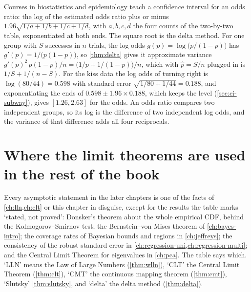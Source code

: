 \begin{bridge}
Courses in biostatistics and epidemiology teach a confidence interval for an odds ratio: the log of the estimated odds ratio plus or minus $1.96\sqrt{1/a + 1/b + 1/c + 1/d}$, with $a, b, c, d$ the four counts of the two-by-two table, exponentiated at both ends.
The square root is the delta method.
For one group with $S$ successes in $n$ trials, the log odds $g(p) = \log\big(p/(1-p)\big)$ has $g'(p) = 1/\big(p(1-p)\big)$, so \cref{thm:delta} gives it approximate variance $g'(p)^2 \, p(1-p)/n = \big(1/p + 1/(1-p)\big)/n$, which with $\hat{p} = S/n$ plugged in is $1/S + 1/(n - S)$.
For the kiss data the log odds of turning right is $\log(80/44) = 0.598$ with standard error $\sqrt{1/80 + 1/44} = 0.188$, and exponentiating the ends of $0.598 \pm 1.96 \times 0.188$, which keeps the level (\cref{sec:ci-subway}), gives $[1.26, 2.63]$ for the odds.
An odds ratio compares two independent groups, so its log is the difference of two independent log odds, and the variance of that difference adds all four reciprocals.
\end{bridge}

\section{Where the limit theorems are used in the rest of the book}
\label{sec:conv-where-used}

Every asymptotic statement in the later chapters is one of the facts of \cref{ch:lln,ch:clt} or this chapter in disguise, except for the results the table marks `stated, not proved': Donsker's theorem about the whole empirical CDF, behind the Kolmogorov--Smirnov test; the Bernstein--von Mises theorem of \cref{ch:bayes-intro}; the coverage rates of Bayesian bounds and regions in \cref{ch:jeffreys}; the consistency of the robust standard error in \cref{ch:regression-uni,ch:regression-multi}; and the Central Limit Theorem for eigenvalues in \cref{ch:pca}.
The table says which.
`LLN' means the Law of Large Numbers (\cref{thm:wlln}), `CLT' the Central Limit Theorem (\cref{thm:clt}), `CMT' the continuous mapping theorem (\cref{thm:cmt}), `Slutsky' \cref{thm:slutsky}, and `delta' the delta method (\cref{thm:delta}).

